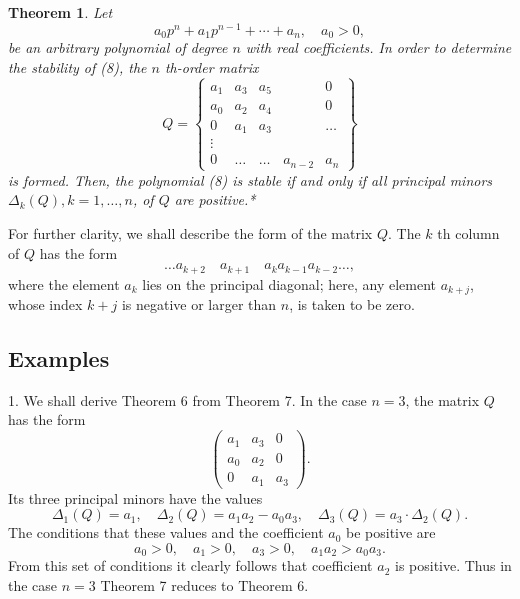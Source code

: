 \documentclass[10pt,a5paper]{book}
\theoremstyle{plain}
\newtheorem{theorem}{Theorem}
\theoremstyle{definition}
\theoremstyle{remark}
\begin{document}
\begin{theorem}
Let
\begin{equation*}
a_{0} p^{n}+a_{1} p^{n-1}+\cdots+a_{n}, \quad a_{0}>0, \tag{8}
\end{equation*}
be an arbitrary polynomial of degree $n$ with real coefficients. In order to determine the stability of (8), the $n$ th-order matrix
\[
Q=\left\{\begin{array}{ccccc}
a_{1} & a_{3} & a_{5} & & 0 \\
a_{0} & a_{2} & a_{4} & & 0 \\
0 & a_{1} & a_{3} & & \ldots \\
\vdots & & & & \\
0 & \ldots & \ldots & a_{n-2} & a_{n}
\end{array}\right\}
\]
is formed. Then, the polynomial (8) is stable if and only if all principal minors $\Delta_{k}(Q), k=1, \ldots, n$, of $Q$ are positive.*
\end{theorem}

For further clarity, we shall describe the form of the matrix $Q$. The $k$ th column of $Q$ has the form
\[
\ldots a_{k+2} \quad a_{k+1} \quad a_{k} a_{k-1} a_{k-2} \ldots,
\]
where the element $a_{k}$ lies on the principal diagonal; here, any element $a_{k+j}$, whose index $k+j$ is negative or larger than $n$, is taken to be zero.

\subsection*{Examples}
1. We shall derive Theorem 6 from Theorem 7. In the case $n=3$, the matrix $Q$ has the form
\[
\left(\begin{array}{ccc}
a_{1} & a_{3} & 0 \\
a_{0} & a_{2} & 0 \\
0 & a_{1} & a_{3}
\end{array}\right) .
\]
Its three principal minors have the values
\[
\Delta_{1}(Q)=a_{1}, \quad \Delta_{2}(Q)=a_{1} a_{2}-a_{0} a_{3}, \quad \Delta_{3}(Q)=a_{3} \cdot \Delta_{2}(Q) .
\]
The conditions that these values and the coefficient $a_{0}$ be positive are
\[
a_{0}>0, \quad a_{1}>0, \quad a_{3}>0, \quad a_{1} a_{2}>a_{0} a_{3} .
\]
From this set of conditions it clearly follows that coefficient $a_{2}$ is positive. Thus in the case $n=3$ Theorem 7 reduces to Theorem 6.
\end{document}

